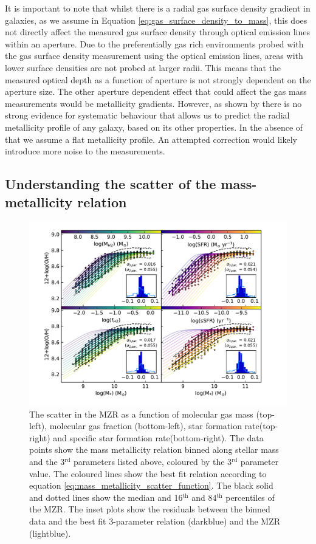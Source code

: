 \documentclass[fleqn,usenatbib]{mnras}
\begin{document}
It is important to note that whilst there is a radial gas surface density gradient in galaxies, as we assume in Equation \ref{eq:gas_surface_density_to_mass}, this does not directly affect the measured gas surface density through optical emission lines within an aperture. Due to the preferentially gas rich environments probed with the gas surface density measurement using the optical emission lines, areas with lower surface densities are not probed at larger radii. This means that the measured optical depth as a function of aperture is not strongly dependent on the aperture size. The other aperture dependent effect that could affect the gas mass measurements would be metallicity gradients. However, as shown by \cite{lutz2021} there is no strong evidence for systematic behaviour that allows us to predict the radial metallicity profile of any galaxy, based on its other properties. In the absence of that we assume a flat metallicity profile. An attempted correction would likely introduce more noise to the measurements.


\subsection{Understanding the scatter of the mass-metallicity relation}
\label{sec:MZR}

\begin{figure}
    \centering
    \includegraphics[width=2\columnwidth]{figures/fig11.pdf}
    \caption{The scatter in the MZR as a function of molecular gas mass (top-left), molecular gas fraction (bottom-left), star formation rate(top-right) and specific star formation rate(bottom-right). The data points show the mass metallicity relation binned along stellar mass and the 3$^{\textrm{rd}}$ parameters listed above, coloured by the 3$^{\textrm{rd}}$ parameter value. The coloured lines show the best fit relation according to equation \ref{eq:mass_metallicity_scatter_function}. The black solid and dotted lines show the median and 16$^{\textrm{th}}$ and 84$^{\textrm{th}}$ percentiles of the MZR. The inset plots show the residuals between the binned data and the best fit 3-parameter relation (darkblue) and the MZR (lightblue).}
    \label{fig:MZR_binned}
\end{figure}
\end{document}
